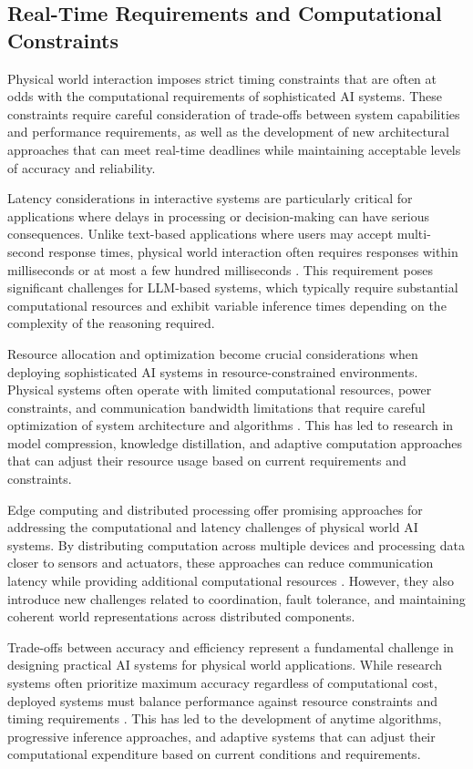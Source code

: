 \subsection{Real-Time Requirements and Computational Constraints}

Physical world interaction imposes strict timing constraints that are often at odds with the computational requirements of sophisticated AI systems. These constraints require careful consideration of trade-offs between system capabilities and performance requirements, as well as the development of new architectural approaches that can meet real-time deadlines while maintaining acceptable levels of accuracy and reliability.

Latency considerations in interactive systems are particularly critical for applications where delays in processing or decision-making can have serious consequences. Unlike text-based applications where users may accept multi-second response times, physical world interaction often requires responses within milliseconds or at most a few hundred milliseconds \cite{lim2020real}. This requirement poses significant challenges for LLM-based systems, which typically require substantial computational resources and exhibit variable inference times depending on the complexity of the reasoning required.

Resource allocation and optimization become crucial considerations when deploying sophisticated AI systems in resource-constrained environments. Physical systems often operate with limited computational resources, power constraints, and communication bandwidth limitations that require careful optimization of system architecture and algorithms \cite{li2020survey}. This has led to research in model compression, knowledge distillation, and adaptive computation approaches that can adjust their resource usage based on current requirements and constraints.

Edge computing and distributed processing offer promising approaches for addressing the computational and latency challenges of physical world AI systems. By distributing computation across multiple devices and processing data closer to sensors and actuators, these approaches can reduce communication latency while providing additional computational resources \cite{wang2022survey}. However, they also introduce new challenges related to coordination, fault tolerance, and maintaining coherent world representations across distributed components.

Trade-offs between accuracy and efficiency represent a fundamental challenge in designing practical AI systems for physical world applications. While research systems often prioritize maximum accuracy regardless of computational cost, deployed systems must balance performance against resource constraints and timing requirements \cite{schwartz2020green}. This has led to the development of anytime algorithms, progressive inference approaches, and adaptive systems that can adjust their computational expenditure based on current conditions and requirements.


